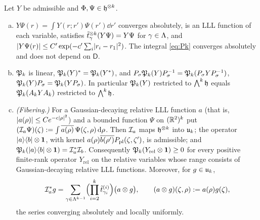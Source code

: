 \begin{lemma}\label{lem:Pk}
Let $Y$ be admissible and $\Phi,\Psi\in\mathfrak{h}^{\otimes k}$.
\begin{enumerate}[(a)]
\item $Y\Psi(r)=\int Y(r;r')\Psi(r')\dd r'$ converges absolutely, is an LLL function of each variable, satisfies
$\tilde t^{\otimes k}_\gamma(Y\Psi)=Y\Psi$ for $\gamma\in\Lambda$, and $\lvert Y\Psi(r)\rvert\le C'\exp(-c'\sum_i\lvert r_i-r_1\rvert^2)$. The integral
\eqref{eq:Pk} converges absolutely and does not depend on $\mathsf D$.
\item $\mathfrak{P}_k$ is linear, $\mathfrak{P}_k(Y)^*=\mathfrak{P}_k(Y^*)$, and $P_\sigma\mathfrak{P}_k(Y)P_\sigma^{-1}=\mathfrak{P}_k(P_\sigma YP_\sigma^{-1})$,
$\mathfrak{P}_k(Y)P_\sigma=\mathfrak{P}_k(YP_\sigma)$. In particular $\mathfrak{P}_k(Y)$ restricted to $\bigwedge^k\mathfrak{h}$ equals $\mathfrak{P}_k(A_kYA_k)$
restricted to $\bigwedge^k\mathfrak{h}$.
\item \emph{(Fibering.)} For a Gaussian-decaying relative LLL function $a$ (that is, $\lvert a(\rho)\rvert\le Ce^{-c\lvert\rho\rvert^2}$) and a
bounded function $\Psi$ on $(\mathbb{R}^2)^k$ put $(\mathcal{I}_a\Psi)(\zeta):=\int\overline{a(\rho)}\,\Psi(\zeta,\rho)\,\mathrm{d}\rho$. Then $\mathcal{I}_a$
maps $\mathfrak{h}^{\otimes k}$ into $\mathfrak{u}_k$; the operator $\lvert a\rangle\langle b\rvert\otimes\mathbf{1}$, with kernel $a(\rho)\overline{b(\rho')}P_{\mathrm{pl}}(\zeta,\zeta')$,
is admissible; and $\mathfrak{P}_k(\lvert a\rangle\langle b\rvert\otimes\mathbf{1})=\mathcal{I}_a^*\mathcal{I}_b$. Consequently $\mathfrak{P}_k(Y_{\mathrm{rel}}\otimes\mathbf{1})\ge0$ for every
positive finite-rank operator $Y_{\mathrm{rel}}$ on the relative variables whose range consists of Gaussian-decaying
relative LLL functions. Moreover, for $g\in\mathfrak{u}_k$,
\begin{equation}\label{eq:Fstar}
\mathcal{I}_a^*g=\sum_{\gamma\in\Lambda^{k-1}}\Bigl(\prod_{i=2}^k\tilde t^{(i)}_{\gamma_i}\Bigr)\bigl(a\otimes g\bigr),\qquad (a\otimes g)(\zeta,\rho):=a(\rho)g(\zeta),
\end{equation}
the series converging absolutely and locally uniformly.
\end{enumerate}
\end{lemma}

